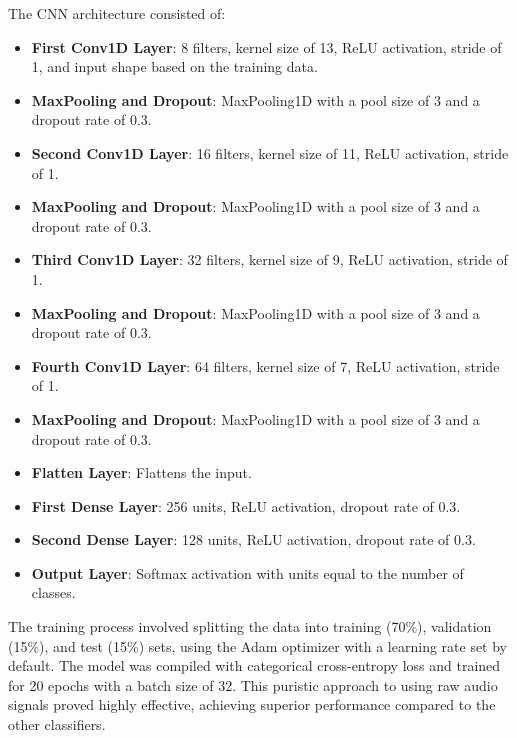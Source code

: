 The CNN architecture consisted of:
\begin{itemize}
    \item \textbf{First Conv1D Layer}: 8 filters, kernel size of 13, ReLU activation, stride of 1, and input shape based on the training data.
    \item \textbf{MaxPooling and Dropout}: MaxPooling1D with a pool size of 3 and a dropout rate of 0.3.
    \item \textbf{Second Conv1D Layer}: 16 filters, kernel size of 11, ReLU activation, stride of 1.
    \item \textbf{MaxPooling and Dropout}: MaxPooling1D with a pool size of 3 and a dropout rate of 0.3.
    \item \textbf{Third Conv1D Layer}: 32 filters, kernel size of 9, ReLU activation, stride of 1.
    \item \textbf{MaxPooling and Dropout}: MaxPooling1D with a pool size of 3 and a dropout rate of 0.3.
    \item \textbf{Fourth Conv1D Layer}: 64 filters, kernel size of 7, ReLU activation, stride of 1.
    \item \textbf{MaxPooling and Dropout}: MaxPooling1D with a pool size of 3 and a dropout rate of 0.3.
    \item \textbf{Flatten Layer}: Flattens the input.
    \item \textbf{First Dense Layer}: 256 units, ReLU activation, dropout rate of 0.3.
    \item \textbf{Second Dense Layer}: 128 units, ReLU activation, dropout rate of 0.3.
    \item \textbf{Output Layer}: Softmax activation with units equal to the number of classes.
\end{itemize}

The training process involved splitting the data into training (70\%), validation (15\%), and test (15\%) sets, using the Adam optimizer with a learning rate set by default. The model was compiled with categorical cross-entropy loss and trained for 20 epochs with a batch size of 32. This puristic approach to using raw audio signals proved highly effective, achieving superior performance compared to the other classifiers.
